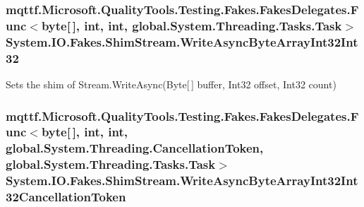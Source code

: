 \hypertarget{class_system_1_1_i_o_1_1_fakes_1_1_shim_stream_af7d9dd8a6ad6416c612b59e53ef47042}{
\subsubsection[{Write\-Async\-Byte\-Array\-Int32\-Int32}]{\setlength{\rightskip}{0pt plus 5cm}mqttf.\-Microsoft.\-Quality\-Tools.\-Testing.\-Fakes.\-Fakes\-Delegates.\-Func$<$byte\mbox{[}$\,$\mbox{]}, int, int, global.\-System.\-Threading.\-Tasks.\-Task$>$ System.\-I\-O.\-Fakes.\-Shim\-Stream.\-Write\-Async\-Byte\-Array\-Int32\-Int32\hspace{0.3cm}{\ttfamily [set]}}}\label{class_system_1_1_i_o_1_1_fakes_1_1_shim_stream_af7d9dd8a6ad6416c612b59e53ef47042}


Sets the shim of Stream.\-Write\-Async(\-Byte\mbox{[}$\,$\mbox{]} buffer, Int32 offset, Int32 count)

\hypertarget{class_system_1_1_i_o_1_1_fakes_1_1_shim_stream_a5cf6e845c9f3a0483ff063613ffb363a}{
\subsubsection[{Write\-Async\-Byte\-Array\-Int32\-Int32\-Cancellation\-Token}]{\setlength{\rightskip}{0pt plus 5cm}mqttf.\-Microsoft.\-Quality\-Tools.\-Testing.\-Fakes.\-Fakes\-Delegates.\-Func$<$byte\mbox{[}$\,$\mbox{]}, int, int, global.\-System.\-Threading.\-Cancellation\-Token, global.\-System.\-Threading.\-Tasks.\-Task$>$ System.\-I\-O.\-Fakes.\-Shim\-Stream.\-Write\-Async\-Byte\-Array\-Int32\-Int32\-Cancellation\-Token\hspace{0.3cm}{\ttfamily [set]}}}\label{class_system_1_1_i_o_1_1_fakes_1_1_shim_stream_a5cf6e845c9f3a0483ff063613ffb363a}


